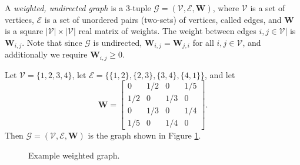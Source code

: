 \documentclass[12pt]{article}
\begin{document}
\begin{defn}
    A \emph{weighted, undirected graph} is a $3$-tuple $\mathcal{G} = (\mathcal{V}, \mathcal{E}, \bm{W})$, where $\mathcal{V}$ is a set of vertices, $\mathcal{E}$ is a set of unordered pairs (two-sets) of vertices, called edges, and $\bm{W}$ is a square $|\mathcal{V}| \times |\mathcal{V}|$ real matrix of weights. The weight between edges $i, j \in \mathcal{V}|$ is $\bm{W}_{i, j}$. Note that since $\mathcal{G}$ is undirected, $\bm{W}_{i,j} = \bm{W}_{j, i}$ for all $i, j \in \mathcal{V}$, and additionally we require $\bm{W}_{i, j} \geq 0$.
\end{defn}

\begin{exmp}
    Let $\mathcal{V} = \{1, 2, 3, 4\}$, let $\mathcal{E} = \{\{1, 2\}, \{2, 3\}, \{3, 4\}, \{4, 1\}\}$, and let
    \[\bm{W} = \begin{bmatrix}
        0 & 1/2 & 0 & 1/5 \\
        1/2 & 0 & 1/3 & 0 \\
        0 & 1/3 & 0 & 1/4 \\
        1/5 & 0 & 1/4 & 0
    \end{bmatrix}.\] Then $\mathcal{G} = (\mathcal{V}, \mathcal{E}, \bm{W})$ is the graph shown in Figure \ref{fig:example-weighted-graph}.
\end{exmp}

\begin{figure}[ht!]
    \centering
\caption{Example weighted graph.}
\label{fig:example-weighted-graph}
\end{figure}
\end{document}
